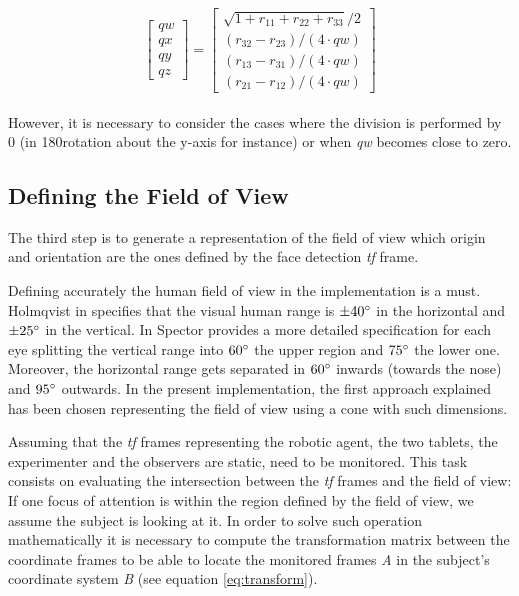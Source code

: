 \documentclass{sig-alternate}
\begin{document}
\begin{equation}
\begin{bmatrix}
qw \\
qx \\
qy \\
qz
\end{bmatrix}
=
\begin{bmatrix}
\sqrt{1 + r_{11} + r_{22} + r_{33}} /2 \\
(r_{32} - r_{23})/( 4 \cdot qw) \\
(r_{13} - r_{31})/( 4 \cdot qw) \\
(r_{21} - r_{12})/( 4 \cdot qw)
\end{bmatrix}
\label{eq:quat}
\end{equation}
\\
However, it is necessary to consider the cases where the division is performed by 0 (in 180\degree rotation about the y-axis for instance) or when \textit{qw} becomes close to zero.

\subsection{Defining the Field of View}
The third step is to generate a representation of the field of view which origin and orientation are the ones defined by the face detection \textit{tf} frame. 

Defining accurately the human field of view in the implementation is a must. Holmqvist in \cite{holmqvist2011eye} specifies that the visual human range is $ \pm  40\degree $ in the horizontal and $ \pm 25\degree $ in the vertical. In \cite{walker1980clinical} Spector provides a more detailed specification for each eye splitting the vertical range into $ 60\degree $ the upper region and $ 75\degree $ the lower one. Moreover, the horizontal range gets separated in $ 60\degree $ inwards (towards the nose) and $ 95\degree $ outwards. In the present implementation, the first approach explained has been chosen representing the field of view using a cone with such dimensions.

Assuming that the \textit{tf} frames representing the robotic agent, the two tablets, the experimenter and the observers are static, need to be monitored. This task consists on evaluating the intersection between the \textit{tf} frames and the field of view: If one focus of attention is within the region defined by the field of view, we assume the subject is looking at it. In order to solve such operation mathematically it is necessary to compute the transformation matrix between the coordinate frames to be able to locate the monitored frames \textit{A} in the subject's coordinate system \textit{B} (see equation \ref{eq:transform}).
\end{document}
